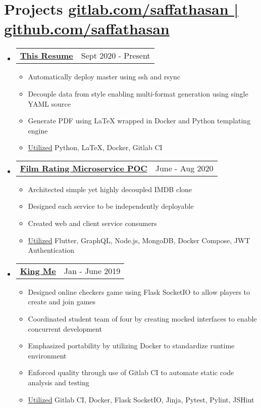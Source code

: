 \documentclass[letterpaper,11pt]{article}
\makeatletter
\newcommand{\resumeItem}[1]{
  \item\small{
    {#1 \vspace{-2pt}}
  }
}
\newcommand{\resumeProjectHeading}[2]{
    \item
    \begin{tabular*}{0.97\textwidth}{l@{\extracolsep{\fill}}r}
      \small#1 & #2 \\
    \end{tabular*}\vspace{-7pt}
}
\newcommand{\resumeSubHeadingListStart}{\begin{itemize}[leftmargin=0.15in, label={}]}
\newcommand{\resumeSubHeadingListEnd}{\end{itemize}}
\newcommand{\resumeItemListStart}{\begin{itemize}}
\newcommand{\resumeItemListEnd}{\end{itemize}\vspace{-5pt}}
\makeatother
\begin{document}
\section{Projects \url{gitlab.com/saffathasan | github.com/saffathasan}}
    \resumeSubHeadingListStart
      \resumeProjectHeading
          {\href{https://gitlab.com/saffathasan/resume}{\textbf{This Resume}}}
          {Sept 2020 - Present}
          \resumeItemListStart
            \resumeItem{Automatically deploy master using ssh and rsync}
            \resumeItem{Decouple data from style enabling multi-format generation using single YAML source}
            \resumeItem{Generate PDF using LaTeX wrapped in Docker and Python templating engine}
            \resumeItem{\ul{Utilized} Python, LaTeX, Docker, Gitlab CI}
          \resumeItemListEnd
      \resumeProjectHeading
          {\href{https://gitlab.com/saffathasan/se572}{\textbf{Film Rating Microservice POC}}}
          {June - Aug 2020}
          \resumeItemListStart
            \resumeItem{Architected simple yet highly decoupled IMDB clone}
            \resumeItem{Designed each service to be independently deployable}
            \resumeItem{Created web and client service consumers}
            \resumeItem{\ul{Utilized} Flutter, GraphQL, Node.js, MongoDB, Docker Compose, JWT Authentication}
          \resumeItemListEnd
      \resumeProjectHeading
          {\href{https://gitlab.com/saffathasan/king-me}{\textbf{King Me}}}
          {Jan - June 2019}
          \resumeItemListStart
            \resumeItem{Designed online checkers game using Flask SocketIO to allow players to create and join games}
            \resumeItem{Coordinated student team of four by creating mocked interfaces to enable concurrent development}
            \resumeItem{Emphasized portability by utilizing Docker to standardize runtime environment}
            \resumeItem{Enforced quality through use of Gitlab CI to automate static code analysis and testing}
            \resumeItem{\ul{Utilized} Gitlab CI, Docker, Flask SocketIO, Jinja, Pytest, Pylint, JSHint}
          \resumeItemListEnd
    \resumeSubHeadingListEnd


%
\end{document}
